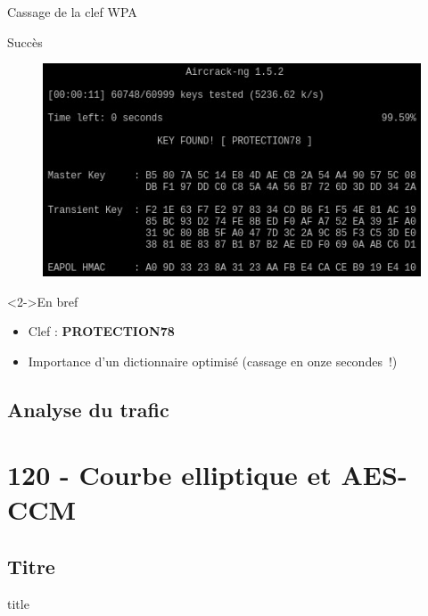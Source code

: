\documentclass[10pt,sans,usenames,dvipsnames,french,compress]{beamer}
\begin{document}
\begin{frame}{Cassage de la clef WPA}
	\begin{block}{Succès}
		\begin{figure}
			\includegraphics[width=0.7\linewidth]{118/aircrack1}
		\end{figure}
	\end{block}

	\begin{exampleblock}<2->{En bref}
		\begin{itemize}
			\item Clef : \textbf{PROTECTION78}
			\item<3-> Importance d'un dictionnaire optimisé (cassage en onze secondes !)
		\end{itemize}
	\end{exampleblock}
\end{frame}


\subsection{Analyse du trafic}


\section{120 - Courbe elliptique et AES-CCM}
\subsection{Titre}
\begin{frame}
	\begin{beamercolorbox}[sep=8pt,center]{title}
	\end{beamercolorbox}
\end{frame}
\end{document}
